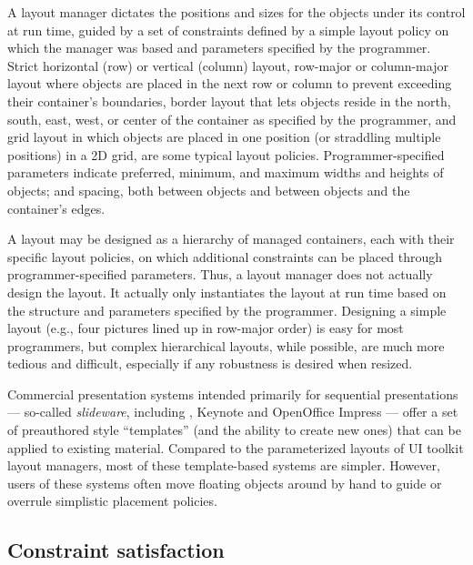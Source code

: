     A layout manager dictates the positions and sizes for the objects under its
    control at run time, guided by a set of constraints defined by a simple
    layout policy on which the manager was based and parameters specified by
    the programmer. Strict horizontal (row) or vertical (column) layout,
    row-major or column-major layout where objects are placed in the next row
    or column to prevent exceeding their container’s boundaries, border layout
    that lets objects reside in the north, south, east, west, or center of the
    container as specified by the programmer, and grid layout in which objects
    are placed in one position (or straddling multiple positions) in a 2D grid,
    are some typical layout policies. Programmer-specified parameters indicate
    preferred, minimum, and maximum widths and heights of objects; and spacing,
    both between objects and between objects and the container’s edges. 

    A layout may be designed as a hierarchy of managed containers, each with
    their specific layout policies, on which additional constraints can be
    placed through programmer-specified parameters. Thus, a layout manager
    does not actually design the layout. It actually only instantiates the
    layout at run time based on the structure and parameters specified by the
    programmer. Designing a simple layout (e.g., four pictures lined up in
    row-major order) is easy for most programmers, but complex hierarchical
    layouts, while possible, are much more tedious and difficult, especially if
    any robustness is desired when resized.

    Commercial presentation systems intended primarily for sequential
    presentations --- so-called \emph{slideware}, including \ppt, Keynote and
    OpenOffice Impress --- offer a set of preauthored style “templates” (and
    the ability to create new ones) that can be applied to existing material.
    Compared to the parameterized layouts of UI toolkit layout managers, most
    of these template-based systems are simpler. However, users of these
    systems often move floating objects around by hand to guide or overrule
    simplistic placement policies.

   \subsection{Constraint satisfaction}
    \label{constraint-satisfaction}

